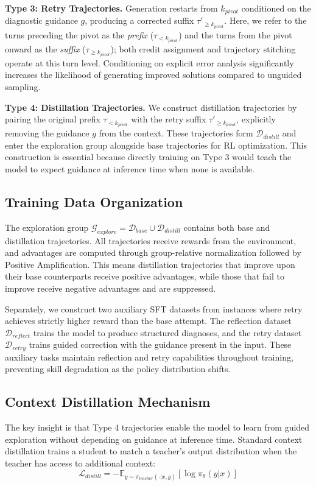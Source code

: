 \documentclass{article} %
\theoremstyle{definition}
\theoremstyle{remark}
\begin{document}
\textbf{Type 3: Retry Trajectories.} Generation restarts from $k_{pivot}$ conditioned on the diagnostic guidance $g$, producing a corrected suffix $\tau'_{\geq k_{pivot}}$. Here, we refer to the turns preceding the pivot as the \emph{prefix} ($\tau_{<k_{pivot}}$) and the turns from the pivot onward as the \emph{suffix} ($\tau_{\geq k_{pivot}}$); both credit assignment and trajectory stitching operate at this turn level. Conditioning on explicit error analysis significantly increases the likelihood of generating improved solutions compared to unguided sampling.

\textbf{Type 4: Distillation Trajectories.} We construct distillation trajectories by pairing the original prefix $\tau_{<k_{pivot}}$ with the retry suffix $\tau'_{\geq k_{pivot}}$, explicitly removing the guidance $g$ from the context. These trajectories form $\mathcal{D}_{distill}$ and enter the exploration group alongside base trajectories for RL optimization. This construction is essential because directly training on Type 3 would teach the model to expect guidance at inference time when none is available.

\subsection{Training Data Organization}

The exploration group $\mathcal{G}_{explore} = \mathcal{D}_{base} \cup \mathcal{D}_{distill}$ contains both base and distillation trajectories. All trajectories receive rewards from the environment, and advantages are computed through group-relative normalization followed by Positive Amplification. This means distillation trajectories that improve upon their base counterparts receive positive advantages, while those that fail to improve receive negative advantages and are suppressed.

Separately, we construct two auxiliary SFT datasets from instances where retry achieves strictly higher reward than the base attempt. The reflection dataset $\mathcal{D}_{reflect}$ trains the model to produce structured diagnoses, and the retry dataset $\mathcal{D}_{retry}$ trains guided correction with the guidance present in the input. These auxiliary tasks maintain reflection and retry capabilities throughout training, preventing skill degradation as the policy distribution shifts.

\subsection{Context Distillation Mechanism}
The key insight is that Type 4 trajectories enable the model to learn from guided exploration without depending on guidance at inference time. Standard context distillation trains a student to match a teacher's output distribution when the teacher has access to additional context:
\begin{equation}
\mathcal{L}_{distill} = -\mathbb{E}_{y \sim \pi_{teacher}(\cdot | x, g)} \left[ \log \pi_{\theta}(y | x) \right]
\end{equation}
\end{document}
